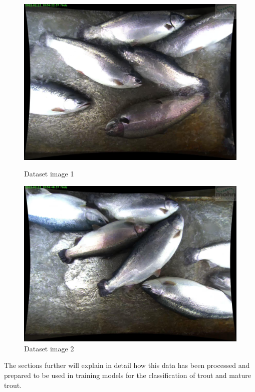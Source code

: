 \begin{figure}[ht!]
  \centering
  \begin{minipage}[b]{0.4\textwidth}
    \centering
    \includegraphics[width=\textwidth]{Figures/img_1.jpg}
    \caption{Dataset image 1}
    \label{fig:image1}
  \end{minipage}
  \hfill
  \begin{minipage}[b]{0.4\textwidth}
    \centering
    \includegraphics[width=\textwidth]{Figures/image_2.jpg}
    \caption{Dataset image 2}
    \label{fig:image2}
  \end{minipage}
\end{figure}

The sections further will explain in detail how this data has been processed and prepared to be used in training models for the classification of trout and mature trout.

